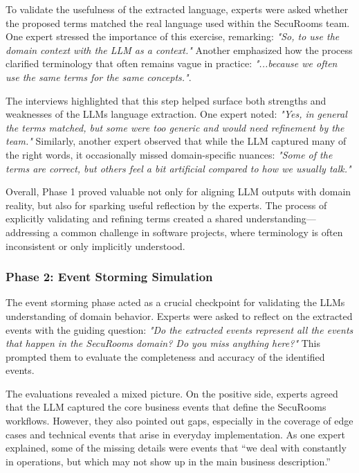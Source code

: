 To validate the usefulness of the extracted language, experts were asked whether the proposed terms matched the real language used within the SecuRooms team. One expert stressed the importance of this exercise, remarking: \textit{"So, to use the domain context with the LLM as a context."} Another emphasized how the process clarified terminology that often remains vague in practice: \textit{"...because we often use the same terms for the same concepts."}.  

The interviews highlighted that this step helped surface both strengths and weaknesses of the LLMs language extraction. One expert noted: \textit{"Yes, in general the terms matched, but some were too generic and would need refinement by the team."} Similarly, another expert observed that while the LLM captured many of the right words, it occasionally missed domain-specific nuances: \textit{"Some of the terms are correct, but others feel a bit artificial compared to how we usually talk."}  

Overall, Phase 1 proved valuable not only for aligning LLM outputs with domain reality, but also for sparking useful reflection by the experts. The process of explicitly validating and refining terms created a shared understanding—addressing a common challenge in software projects, where terminology is often inconsistent or only implicitly understood. 

\subsubsection{Phase 2: Event Storming Simulation}
The event storming phase acted as a crucial checkpoint for validating the LLMs understanding of domain behavior. Experts were asked to reflect on the extracted events with the guiding question: \textit{"Do the extracted events represent all the events that happen in the SecuRooms domain? Do you miss anything here?"} This prompted them to evaluate the completeness and accuracy of the identified events.  

The evaluations revealed a mixed picture. On the positive side, experts agreed that the LLM captured the core business events that define the SecuRooms workflows. However, they also pointed out gaps, especially in the coverage of edge cases and technical events that arise in everyday implementation. As one expert explained, some of the missing details were events that “we deal with constantly in operations, but which may not show up in the main business description.”  

